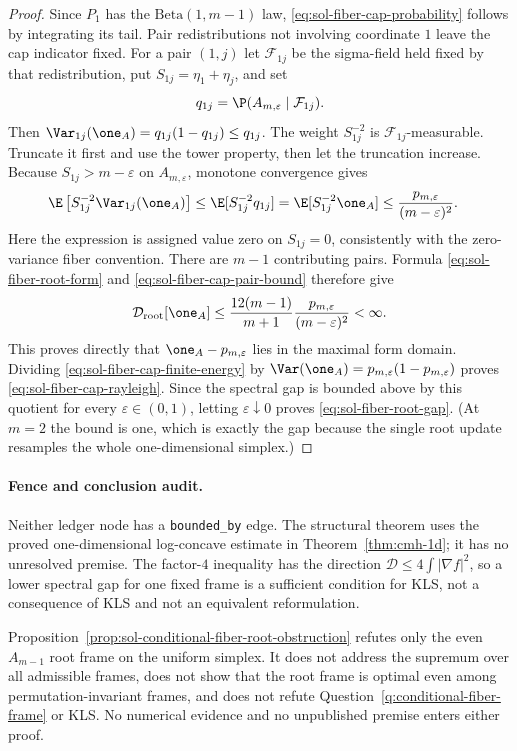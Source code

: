 \documentclass[../main.tex]{subfiles}
\begin{document}
\begin{proof}
Since $P_1$ has the $\mathrm{Beta}(1,m-1)$ law,
\eqref{eq:sol-fiber-cap-probability} follows by integrating its tail.  Pair redistributions not
involving coordinate $1$ leave the cap indicator fixed.  For a pair $(1,j)$ let
$\mathcal F_{1j}$ be the sigma-field held fixed by that redistribution, put
$S_{1j}=\eta_1+\eta_j$, and set
\begin{equation}
 q_{1j}=\P(A_{m,\varepsilon}\mid\mathcal F_{1j}).
\end{equation}
Then
$\Var_{1j}(\one_A)=q_{1j}(1-q_{1j})\le q_{1j}$.  The weight $S_{1j}^{-2}$ is
$\mathcal F_{1j}$-measurable.  Truncate it first and use the tower property, then let the
truncation increase.  Because $S_{1j}>m-\varepsilon$ on $A_{m,\varepsilon}$, monotone
convergence gives
\begin{align}
 \E\left[S_{1j}^{-2}\Var_{1j}(\one_A)\right]
 &\le\E[S_{1j}^{-2}q_{1j}]
 =\E[S_{1j}^{-2}\one_A]
 \le\frac{p_{m,\varepsilon}}{(m-\varepsilon)^2}.
 \label{eq:sol-fiber-cap-pair-bound}
\end{align}
Here the expression is assigned value zero on $S_{1j}=0$, consistently with the zero-variance
fiber convention.  There are $m-1$ contributing pairs.  Formula
\eqref{eq:sol-fiber-root-form} and \eqref{eq:sol-fiber-cap-pair-bound} therefore give
\begin{equation}
 \mathcal D_{\rm root}[\one_A]
 \le\frac{12(m-1)}{m+1}
       \frac{p_{m,\varepsilon}}{(m-\varepsilon)^2}<\infty.
 \label{eq:sol-fiber-cap-finite-energy}
\end{equation}
This proves directly that $\one_A-p_{m,\varepsilon}$ lies in the maximal form domain.  Dividing
\eqref{eq:sol-fiber-cap-finite-energy} by
$\Var(\one_A)=p_{m,\varepsilon}(1-p_{m,\varepsilon})$ proves
\eqref{eq:sol-fiber-cap-rayleigh}.  Since the spectral gap is bounded above by this quotient for
every $\varepsilon\in(0,1)$, letting $\varepsilon\downarrow0$ proves
\eqref{eq:sol-fiber-root-gap}.  (At $m=2$ the bound is one, which is exactly the gap because the
single root update resamples the whole one-dimensional simplex.)
\end{proof}

\paragraph{Fence and conclusion audit.}
Neither ledger node has a \texttt{bounded\_by} edge.  The structural theorem uses the proved
one-dimensional log-concave estimate in Theorem~\ref{thm:cmh-1d}; it has no unresolved premise.
The factor-$4$ inequality has the direction
$\mathcal D\le4\int|\nabla f|^2$, so a lower spectral gap for one fixed frame is a sufficient
condition for KLS, not a consequence of KLS and not an equivalent reformulation.

Proposition~\ref{prop:sol-conditional-fiber-root-obstruction} refutes only the even
$A_{m-1}$ root frame on the uniform simplex.  It does not address the supremum over all
admissible frames, does not show that the root frame is optimal even among permutation-invariant
frames, and does not refute Question~\ref{q:conditional-fiber-frame} or KLS.  No numerical
evidence and no unpublished premise enters either proof.
\end{document}
